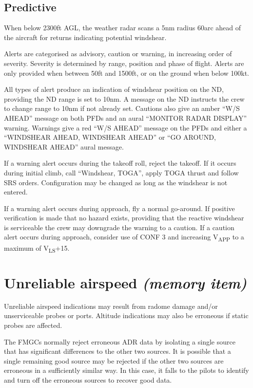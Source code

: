 \documentclass[a5paper,11pt,twoside]{book}
\newcommand{\multicite}[1]{
  \nopagebreak
  \noindent{\footnotesize\color{blue}{[ #1 ]}}
}
\newcommand{\V}[1]{V\textsubscript{#1}}
\begin{document}
\multicite{FCOM~PRO.AEP.SURV}

\subsection{Predictive}

When below 2300ft AGL, the weather radar scans a 5nm radius 60\textdegree{ }arc ahead of the
aircraft for returns indicating potential windshear.

Alerts are categorised as advisory, caution or warning, in increasing order of
severity. Severity is determined by range, position and phase of flight. Alerts
are only provided when between 50ft and 1500ft, or on the ground when below
100kt.

All types of alert produce an indication of windshear position on the ND,
providing the ND range is set to 10nm. A message on the ND instructs the crew to
change range to 10nm if not already set. Cautions also give an amber ``W/S AHEAD''
message on both PFDs and an aural ``MONITOR RADAR DISPLAY'' warning. Warnings give
a red ``W/S AHEAD'' message on the PFDs and either a ``WINDSHEAR AHEAD, WINDSHEAR
AHEAD'' or ``GO AROUND, WINDSHEAR AHEAD'' aural message.

If a warning alert occurs during the takeoff roll, reject the takeoff. If it
occurs during initial climb, call ``Windshear, TOGA'', apply TOGA thrust and
follow SRS orders. Configuration may be changed as long as the windshear is not
entered.

If a warning alert occurs during approach, fly a normal go-around. If positive
verification is made that no hazard exists, providing that the reactive
windshear is serviceable the crew may downgrade the warning to a caution. If a
caution alert occurs during approach, consider use of CONF 3 and increasing
\V{APP} to a maximum of \V{LS}+15.

\multicite{FCOM~PRO.AES.SURV}

\section{Unreliable airspeed \emph{(memory item)}}

Unreliable airspeed indications may result from radome damage and/or
unserviceable probes or ports. Altitude indications may also be erroneous if
static probes are affected.

The FMGCs normally reject erroneous ADR data by isolating a single source that
has significant differences to the other two sources. It is possible that a
single remaining good source may be rejected if the other two sources are
erroneous in a sufficiently similar way. In this case, it falls to the pilots to
identify and turn off the erroneous sources to recover good data.
\end{document}
